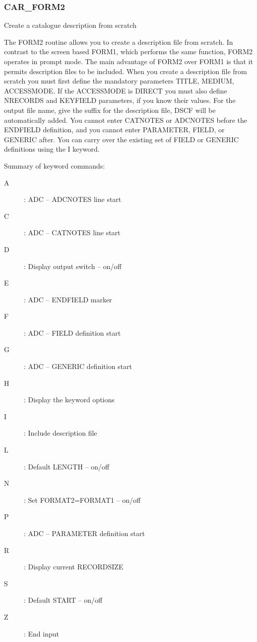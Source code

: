 \subsubsection{CAR\_FORM2}

Create a catalogue description from scratch

The FORM2 routine allows you to create a description file
from scratch.
In contrast to the screen based FORM1, which performs the same
function, FORM2 operates in prompt mode.
The main advantage of FORM2 over FORM1 is that it permits description
files to be included.
When you create a description file from scratch you must first define
the mandatory parameters TITLE, MEDIUM, ACCESSMODE.
If the ACCESSMODE is DIRECT you must also define NRECORDS and KEYFIELD
parameters, if you know their values.
For the output file name, give the suffix for the description file, DSCF
will be automatically added.
You cannot enter CATNOTES or ADCNOTES before the ENDFIELD definition,
and you cannot enter PARAMETER, FIELD, or GENERIC after.
You can carry over the existing set of FIELD or GENERIC definitions using
the I keyword.

Summary of keyword commands:
\begin{description}
\item [A]: ADC -- ADCNOTES line start
\item [C]: ADC -- CATNOTES line start
\item [D]: Display output switch -- on/off
\item [E]: ADC -- ENDFIELD marker
\item [F]: ADC -- FIELD definition start
\item [G]: ADC -- GENERIC definition start
\item [H]: Display the keyword options
\item [I]: Include description file
\item [L]: Default LENGTH -- on/off
\item [N]: Set FORMAT2=FORMAT1 -- on/off
\item [P]: ADC -- PARAMETER definition start
\item [R]: Display current RECORDSIZE
\item [S]: Default START -- on/off
\item [Z]: End input
\end{description}

